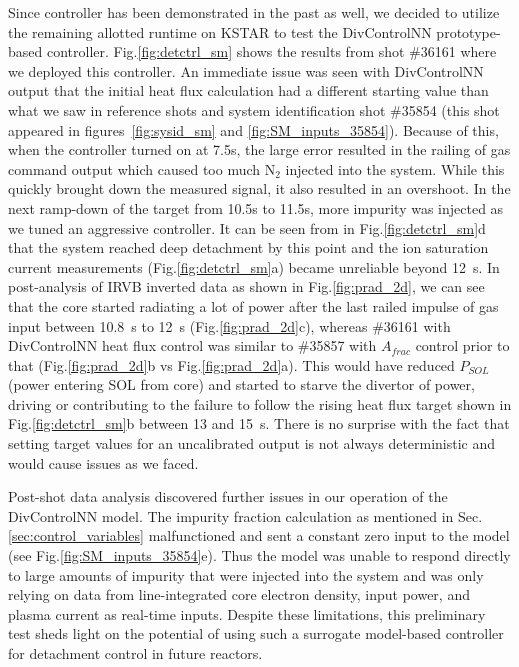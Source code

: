 Since \Afrac controller has been demonstrated in the past as well, we decided to utilize the remaining allotted runtime on KSTAR to test the DivControlNN prototype-based controller.
Fig.\ref{fig:detctrl_sm} shows the results from shot \#36161 where we deployed this controller.
An immediate issue was seen with DivControlNN output that the initial heat flux calculation had a different starting value than what we saw in reference shots and system identification shot \#35854 (this shot appeared in figures~\ref{fig:sysid_sm} and \ref{fig:SM_inputs_35854}).
Because of this, when the controller turned on at 7.5s, the large error resulted in the railing of gas command output which caused too much N$_2$ injected into the system.
While this quickly brought down the measured signal, it also resulted in an overshoot.
In the next ramp-down of the target from 10.5s to 11.5s, more impurity was injected as we tuned an aggressive controller.
It can be seen from \Afrac in Fig.\ref{fig:detctrl_sm}d that the system reached deep detachment by this point and the ion saturation current measurements (Fig.\ref{fig:detctrl_sm}a) became unreliable beyond 12~s.
In post-analysis of IRVB inverted data as shown in Fig.\ref{fig:prad_2d}, we can see that the core started radiating a lot of power after the last railed impulse of gas input between 10.8~s to 12~s (Fig.\ref{fig:prad_2d}c), whereas \#36161 with DivControlNN heat flux control was similar to \#35857 with $A_{frac}$ control prior to that (Fig.\ref{fig:prad_2d}b vs Fig.\ref{fig:prad_2d}a).
This would have reduced $P_{SOL}$ (power entering SOL from core) and started to starve the divertor of power, driving or contributing to the failure to follow the rising heat flux target shown in Fig.\ref{fig:detctrl_sm}b between 13 and 15~s.
There is no surprise with the fact that setting target values for an uncalibrated output is not always deterministic and would cause issues as we faced.

Post-shot data analysis discovered further issues in our operation of the DivControlNN model.
The impurity fraction calculation as mentioned in Sec.\ref{sec:control_variables} malfunctioned and sent a constant zero input to the model (see Fig.\ref{fig:SM_inputs_35854}e).
Thus the model was unable to respond directly to large amounts of impurity that were injected into the system and was only relying on data from line-integrated core electron density, input power, and plasma current as real-time inputs.
Despite these limitations, this preliminary test sheds light on the potential of using such a surrogate model-based controller for detachment control in future reactors.

